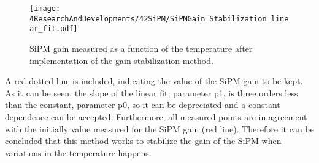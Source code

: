 \begin{figure}[hbtp]
\centering
\texttt{[image: 4ResearchAndDevelopments/42SiPM/SiPMGain\_Stabilization\_linear\_fit.pdf]}
\caption{SiPM gain measured as a function of the temperature after implementation of the gain stabilization method. \label{fig:SiPMGainStabilization}}
\end{figure}

A red dotted line is included, indicating the value of the SiPM gain to be kept. As it can be seen, the slope of the linear fit, parameter p1, is three orders less than the constant, parameter p0, so it can be depreciated and a constant dependence can be accepted. Furthermore, all measured points are in agreement with the initially value measured for the SiPM gain (red line). Therefore it can be concluded that this method works to stabilize the gain of the SiPM when variations in the temperature happens.